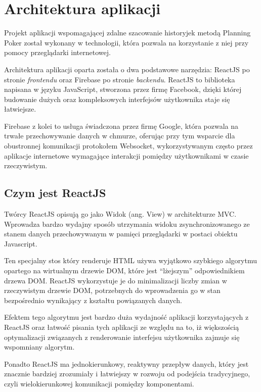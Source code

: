 
\chapter{Architektura aplikacji}

Projekt aplikacji wspomagającej zdalne szacowanie historyjek metodą Planning Poker
został wykonany w technologii, która pozwala na korzystanie z niej przy pomocy przeglądarki internetowej.

Architektura aplikacji oparta została o dwa podstawowe narzędzia:
ReactJS po stronie \textit{frontendu} oraz Firebase po stronie \textit{backendu}.
ReactJS to biblioteka napisana w języku JavaScript, stworzona przez firmę Facebook,
dzięki której budowanie dużych oraz kompleksowych interfejsów użytkownika staje się łatwiejsze.

Firebase z kolei to usługa świadczona przez firmę Google, która
pozwala na trwałe przechowywanie danych w chmurze, oferując przy tym
wsparcie dla obustronnej komunikacji protokołem Websocket, wykorzystywanym często
przez aplikacje internetowe wymagające interakcji pomiędzy użytkownikami w czasie rzeczywistym.

\section{Czym jest ReactJS}

Twórcy ReactJS opisują go jako Widok (ang. View) w architekturze MVC.
Wprowadza bardzo wydajny sposób utrzymania widoku zsynchronizowanego ze stanem danych
przechowywanym w pamięci przeglądarki w postaci obiektu Javascript.

Ten specjalny stos który renderuje HTML używa wyjątkowo szybkiego algorytmu opartego na wirtualnym drzewie DOM,
które jest ``lżejszym'' odpowiednikiem drzewa DOM. ReactJS wykorzystuje je
do minimalizacji liczby zmian w rzeczywistym drzewie DOM, potrzebnych do wprowadzenia go
w stan bezpośrednio wynikający z kształtu powiązanych danych.

Efektem tego algorytmu jest bardzo duża wydajność aplikacji korzystających z ReactJS oraz
łatwość pisania tych aplikacji ze względu na to, iż większością optymalizacji związanych
z renderowanie interfejsu użytkownika zajmuje się wspomniany algorytm.

Ponadto ReactJS ma jednokierunkowy, reaktywny przepływ danych,
który jest znacznie bardziej zrozumiały i łatwiejszy w rozwoju od podejścia tradycyjnego,
czyli wielokierunkowej komunikacji pomiędzy komponentami.

